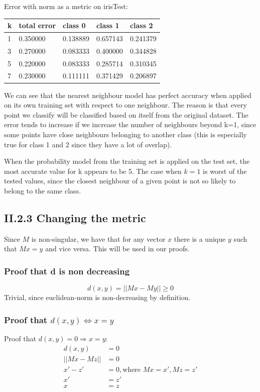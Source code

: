 \documentclass[a4paper,10pt]{article}
\begin{document}
Error with norm as a metric on irisTest:
\begin{center}
\begin{tabular}{l|llll}
 k & total error & class 0 & class 1 & class 2\\ \hline
 1 & 0.350000 & 0.138889 & 0.657143 & 0.241379\\
 3 & 0.270000 & 0.083333 & 0.400000 & 0.344828\\
 5 & 0.220000 & 0.083333 & 0.285714 & 0.310345\\
 7 & 0.230000 & 0.111111 & 0.371429 & 0.206897\\
\end{tabular}
\end{center}

We can see that the nearest neighbour model has perfect accuracy when
applied on its own training set with respect to one neighbour. The reason
is that every point we classify will be classified based on itself from
the original dataset. The error tends to increase if we increase the number of
neighbours beyond k=1, since some points have close neighbours belonging to another class (this is especially true for class 1 and 2 since they have a lot of overlap).

When the probability model from the training set is applied on the test set,
the most accurate value for k appears to be 5. The case when $k=1$ is worst
of the tested values, since the closest neighbour of a given point is not
so likely to belong to the same class.

\subsection*{II.2.3 Changing the metric}

Since $M$ is non-singular, we have that for any vector $x$ there is a unique $y$ such that $Mx=y$ and vice versa. This will be used in our proofs.\\

\subsubsection*{Proof that d is non decreasing}
\[
d(x,y)=||Mx-My||\geq0
\]
Trivial, since euclidean-norm is non-decreasing by definition.\\

\subsubsection*{Proof that $d(x,y) \iff x=y$}
Proof that $d(x,y)=0 \Rightarrow x=y$:
\begin{align*}
d(x,y)&=0\\
||Mx-Mz||&=0\\
x'-z'&=0, \text{where }Mx=x', Mz=z'\\
x'&=z'\\
x&=z
\end{align*}
\end{document}
